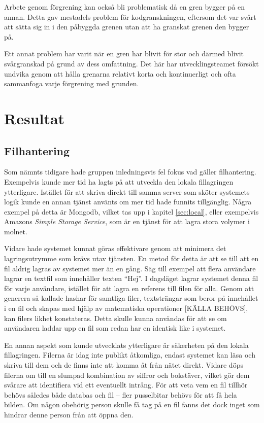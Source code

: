 Arbete genom förgrening kan också bli problematisk då en gren bygger på en annan. Detta gav mestadels problem för kodgranskningen, eftersom det var svårt att sätta sig in i den påbyggda grenen utan att ha granskat grenen den bygger på.

Ett annat problem har varit när en gren har blivit för stor och därmed blivit svårgranskad på grund av dess omfattning. Det här har utvecklingsteamet försökt undvika genom att hålla grenarna relativt korta och kontinuerligt och ofta sammanfoga varje förgrening med grunden.

\section{Resultat}

\subsection{Filhantering}

Som nämnts tidigare hade gruppen inledningsvis fel fokus vad gäller filhantering. Exempelvis kunde mer tid ha lagts på att utveckla den lokala fillagringen ytterligare. Istället för att skriva direkt till samma server som sköter systemets logik kunde en annan tjänst använts om mer tid hade funnits tillgänglig. Några exempel på detta är Mongodb, vilket tas upp i kapitel \ref{sec:local}, eller exempelvis Amazons \emph{Simple Storage Service}, som är en tjänst för att lagra stora volymer i molnet.

Vidare hade systemet kunnat göras effektivare genom att minimera det lagringsutrymme som krävs utav tjänsten. En metod för detta är att se till att en fil aldrig lagras av systemet mer än en gång. Säg till exempel att flera användare lagrar en textfil som innehåller texten ``Hej''. I dagsläget lagrar systemet denna fil för varje användare, istället för att lagra en referens till filen för alla. Genom att generera så kallade hashar för samtliga filer, textsträngar som beror på innehållet i en fil och skapas med hjälp av matematiska operationer [KÄLLA BEHÖVS], kan filers likhet konstateras. Detta skulle kunna användas för att se om användaren laddar upp en fil som redan har en identisk like i systemet.

En annan aspekt som kunde utvecklats ytterligare är säkerheten på den lokala fillagringen. Filerna är idag inte publikt åtkomliga, endast systemet kan läsa och skriva till dem och de finns inte att komma åt från nätet direkt. Vidare döps filerna om till en slumpad kombination av siffror och bokstäver, vilket gör dem svårare att identifiera vid ett eventuellt intrång. För att veta vem en fil tillhör behövs således både databas och fil – fler pusselbitar behövs för att få hela bilden. Om någon obehörig person skulle få tag på en fil fanns det dock inget som hindrar denne person från att öppna den.


